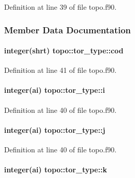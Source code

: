 Definition at line 39 of file topo.\-f90.



\subsubsection{Member Data Documentation}
\hypertarget{structtopo_1_1tor__type_ae3b1ebe21ecf310ce65ebb194857ac2b}{
\paragraph[{cod}]{\setlength{\rightskip}{0pt plus 5cm}integer(shrt) topo\-::tor\-\_\-type\-::cod}}\label{structtopo_1_1tor__type_ae3b1ebe21ecf310ce65ebb194857ac2b}


Definition at line 41 of file topo.\-f90.

\hypertarget{structtopo_1_1tor__type_afadf15821c0373a47c445368d00a5ad5}{
\paragraph[{i}]{\setlength{\rightskip}{0pt plus 5cm}integer(ai) topo\-::tor\-\_\-type\-::i}}\label{structtopo_1_1tor__type_afadf15821c0373a47c445368d00a5ad5}


Definition at line 40 of file topo.\-f90.

\hypertarget{structtopo_1_1tor__type_a2742c4c505d4a703db18f8c1e6ed4d0f}{
\paragraph[{j}]{\setlength{\rightskip}{0pt plus 5cm}integer(ai) topo\-::tor\-\_\-type\-::j}}\label{structtopo_1_1tor__type_a2742c4c505d4a703db18f8c1e6ed4d0f}


Definition at line 40 of file topo.\-f90.

\hypertarget{structtopo_1_1tor__type_a6fbc36e49f995a242a3a3684c74477ff}{
\paragraph[{k}]{\setlength{\rightskip}{0pt plus 5cm}integer(ai) topo\-::tor\-\_\-type\-::k}}\label{structtopo_1_1tor__type_a6fbc36e49f995a242a3a3684c74477ff}


